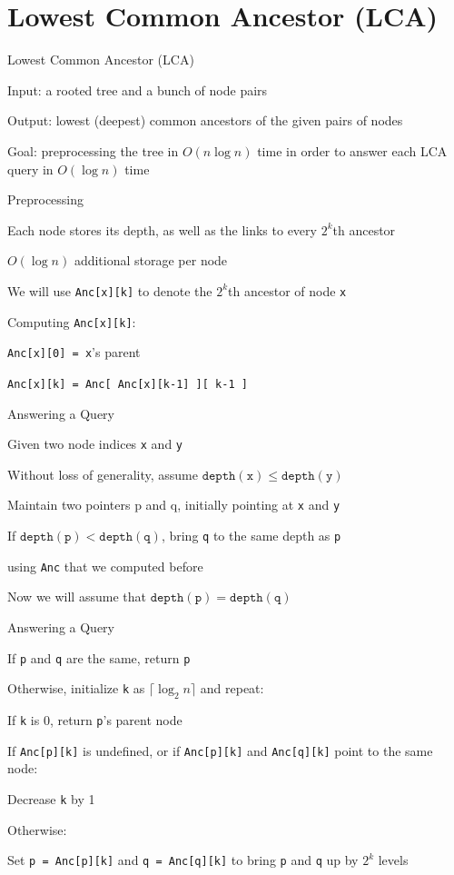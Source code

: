 \documentclass[13pt,onlymath]{beamer}
\begin{document}
\section{Lowest Common Ancestor (LCA)}

\begin{frame}{Lowest Common Ancestor (LCA)}
\BIT
\item Input: a rooted tree and a bunch of node pairs
\item Output: lowest (deepest) common ancestors of the given pairs of nodes
\vfill
\item Goal: preprocessing the tree in $O(n \log n)$ time in order to answer each LCA query in $O(\log n)$ time
\EIT
\end{frame}

\begin{frame}[fragile]{Preprocessing}
\BIT
\item Each node stores its depth, as well as the links to every $2^k$th ancestor
\BIT
\item $O(\log n)$ additional storage per node
\item We will use \verb,Anc[x][k], to denote the $2^k$th ancestor of node \verb,x,
\EIT
\vfill
\item Computing \verb.Anc[x][k].:
\BIT
\item \verb.Anc[x][0] = x.'s parent
\item \verb.Anc[x][k] = Anc[ Anc[x][k-1] ][ k-1 ].
\EIT
\EIT
\end{frame}

\begin{frame}[fragile]{Answering a Query}
\BIT
\item Given two node indices \verb,x, and \verb,y,
\BIT
\item Without loss of generality, assume $\mathtt{depth(x)} \le \mathtt{depth(y)}$
\EIT
\item Maintain two pointers p and q, initially pointing at \verb,x, and \verb,y,
\item If $\mathtt{depth(p)} < \mathtt{depth(q)}$, bring \verb,q, to the same depth as \verb,p,
\BIT
\item using \verb,Anc, that we computed before
\EIT
\item Now we will assume that $\mathtt{depth(p)} = \mathtt{depth(q)}$
\EIT
\end{frame}

\begin{frame}[fragile]{Answering a Query}
\BIT
\item If \verb,p, and \verb,q, are the same, return \verb,p,
\item Otherwise, initialize \verb,k, as $\lceil \log_2 n \rceil$ and repeat:
\BIT
\item If \verb,k, is 0, return \verb,p,'s parent node
\item If \verb,Anc[p][k], is undefined, or if \verb,Anc[p][k], and \verb,Anc[q][k], point to the same node:
\BIT
\item Decrease \verb,k, by 1
\EIT
\item Otherwise:
\BIT
\item Set \verb,p = Anc[p][k], and \verb,q = Anc[q][k], to bring \verb,p, and \verb,q, up by $2^k$ levels
\EIT
\EIT
\EIT
\end{frame}
\end{document}
